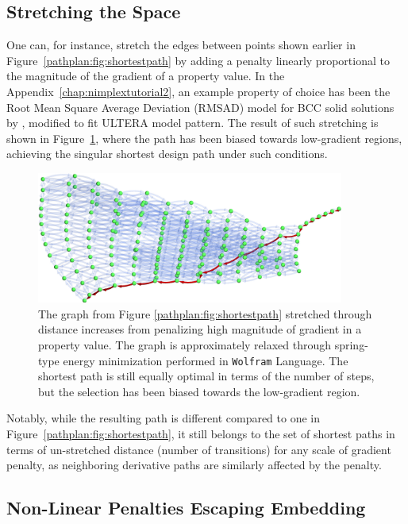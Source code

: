 \subsection{Stretching the Space} \label{pathplan:ssec:gradientstretch}

One can, for instance, stretch the edges between points shown earlier in Figure~\ref{pathplan:fig:shortestpath} by adding a penalty linearly proportional to the magnitude of the gradient of a property value. In the Appendix~\ref{chap:nimplextutorial2}, an example property of choice has been the Root Mean Square Average Deviation (RMSAD) model for BCC solid solutions by \citet{Tandoc2023MiningAlloys}, modified to fit ULTERA model pattern. The result of such stretching is shown in Figure~\ref{pathplan:fig:lowgradient}, where the path has been biased towards low-gradient regions, achieving the singular shortest design path under such conditions. 

\begin{figure}[H]
    \centering
    \includegraphics[width=0.9\textwidth]{pathplanning/InfeasibilityGliding_LowGradient.png}
    \caption{The graph from Figure \ref{pathplan:fig:shortestpath} stretched through distance increases from penalizing high magnitude of gradient in a property value. The graph is approximately relaxed through spring-type energy minimization performed in \texttt{Wolfram} Language. The shortest path is still equally optimal in terms of the number of steps, but the selection has been biased towards the low-gradient region.}
    \label{pathplan:fig:lowgradient}
\end{figure}

Notably, while the resulting path is different compared to one in Figure~\ref{pathplan:fig:shortestpath}, it still belongs to the set of shortest paths in terms of un-stretched distance (number of transitions) for any scale of gradient penalty, as neighboring derivative paths are similarly affected by the penalty.

\subsection{Non-Linear Penalties Escaping Embedding} \label{pathplan:ssec:gradientsquare}

